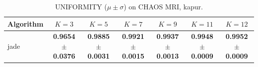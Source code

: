 \begin{table}[htbp]
\centering
\caption{UNIFORMITY ($\mu \pm \sigma$) on CHAOS MRI, kapur.}
\label{tab:exp2-kapur-uniformity}
\begin{tabular}{lcccccc}
\toprule
Algorithm & $K=3$ & $K=5$ & $K=7$ & $K=9$ & $K=11$ & $K=12$ \\
\midrule
jade & \textbf{0.9654 $\pm$ 0.0376} & \textbf{0.9885 $\pm$ 0.0031} & \textbf{0.9921 $\pm$ 0.0015} & \textbf{0.9937 $\pm$ 0.0013} & \textbf{0.9948 $\pm$ 0.0009} & \textbf{0.9952 $\pm$ 0.0009} \\
\bottomrule
\end{tabular}
\end{table}